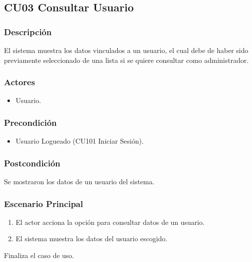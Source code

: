 \subsection{CU03 Consultar Usuario}
\subsubsection{Descripci\'{o}n}
El sistema muestra los datos vinculados a un usuario, el cual debe de haber sido previamente seleccionado de una lista si se quiere consultar como administrador.
\subsubsection{Actores}
\begin{itemize}
\item Usuario.
\end{itemize}
\subsubsection{Precondici\'{o}n}
\begin{itemize}
\item Usuario Logueado (CU101 Iniciar Sesi\'{o}n).
\end{itemize}
\subsubsection{Postcondici\'{o}n}
Se mostraron los datos de un usuario del sistema.
\subsubsection{Escenario Principal}
\begin{enumerate}
\item El actor acciona la opci\'{o}n para consultar datos de un usuario.
\item El sistema muestra los datos del usuario escogido.
\end{enumerate}
Finaliza el caso de uso.